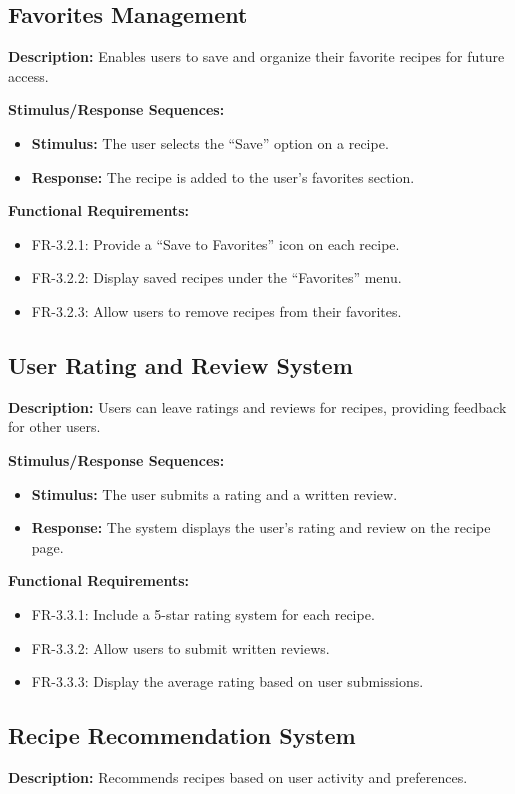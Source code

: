 \documentclass[12pt]{article}
\begin{document}
\subsection{Favorites Management}
\textbf{Description:} Enables users to save and organize their favorite recipes for future access.

\textbf{Stimulus/Response Sequences:}
\begin{itemize}
    \item \textbf{Stimulus:} The user selects the “Save” option on a recipe.
    \item \textbf{Response:} The recipe is added to the user's favorites section.
\end{itemize}

\textbf{Functional Requirements:}
\begin{itemize}
    \item FR-3.2.1: Provide a “Save to Favorites” icon on each recipe.
    \item FR-3.2.2: Display saved recipes under the “Favorites” menu.
    \item FR-3.2.3: Allow users to remove recipes from their favorites.
\end{itemize}

\subsection{User Rating and Review System}
\textbf{Description:} Users can leave ratings and reviews for recipes, providing feedback for other users.

\textbf{Stimulus/Response Sequences:}
\begin{itemize}
    \item \textbf{Stimulus:} The user submits a rating and a written review.
    \item \textbf{Response:} The system displays the user’s rating and review on the recipe page.
\end{itemize}

\textbf{Functional Requirements:}
\begin{itemize}
    \item FR-3.3.1: Include a 5-star rating system for each recipe.
    \item FR-3.3.2: Allow users to submit written reviews.
    \item FR-3.3.3: Display the average rating based on user submissions.
\end{itemize}

\subsection{Recipe Recommendation System}
\textbf{Description:} Recommends recipes based on user activity and preferences.
\end{document}
